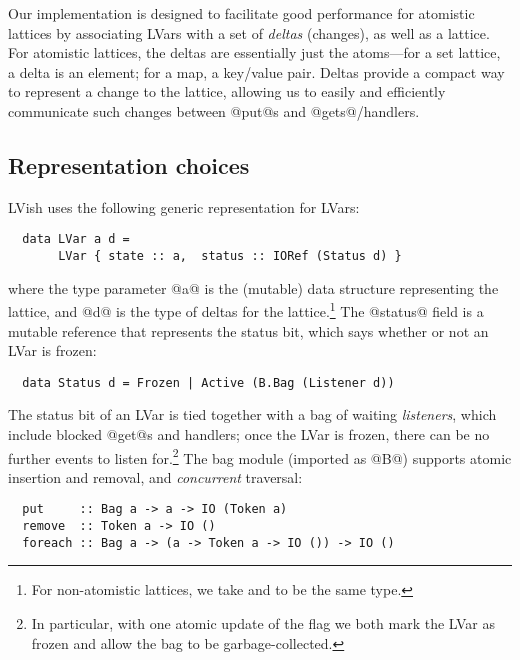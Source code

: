 Our implementation is designed to facilitate good performance for
atomistic lattices by associating LVars with a set of \emph{deltas}
(changes), as well as a lattice.  For atomistic lattices, the deltas
are essentially just the atoms---for a set lattice, a delta is an
element; for a map, a key/value pair.  Deltas provide a compact way to
represent a change to the lattice, allowing us to easily and
efficiently communicate such changes between @put@s and
@gets@/handlers.


\subsection{Representation choices}

LVish uses the following generic representation for LVars:

\begin{lstlisting}
  data LVar a d = 
       LVar { state :: a,  status :: IORef (Status d) }
\end{lstlisting}

where the type parameter @a@ is the (mutable) data structure
representing the lattice, and @d@ is the type of deltas for the
lattice.\footnote{For non-atomistic lattices, we take  and
   to be the same type.}  The @status@ field is a mutable
reference that represents the status bit, which says whether or not an
LVar is frozen:

\begin{lstlisting}
  data Status d = Frozen | Active (B.Bag (Listener d))
\end{lstlisting}

The status bit of an LVar is tied together with a bag of waiting
\emph{listeners}, which include blocked @get@s and handlers; once the
LVar is frozen, there can be no further events to listen
for.\footnote{In particular, with one atomic update of the flag we
  both mark the LVar as frozen and allow the bag to be
  garbage-collected.}  The bag module (imported as @B@) supports
atomic insertion and removal, and \emph{concurrent} traversal:

\begin{lstlisting}
  put     :: Bag a -> a -> IO (Token a)
  remove  :: Token a -> IO ()
  foreach :: Bag a -> (a -> Token a -> IO ()) -> IO ()
\end{lstlisting}

